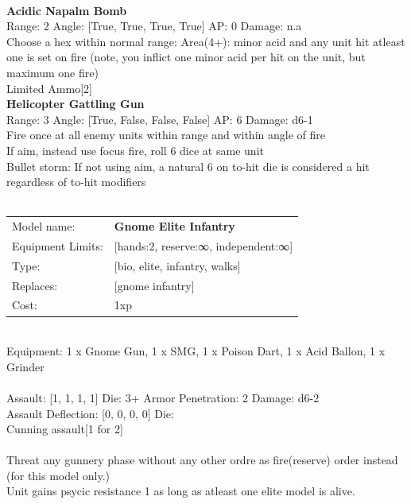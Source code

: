\ \\
{\bf Acidic Napalm Bomb } \\



Range: 2  Angle: [True, True, True, True] AP: 0 Damage: n.a \\
Choose a hex within normal range: Area(4+): minor acid and any unit hit atleast one is set on fire (note, you inflict one minor acid per hit on the unit, but maximum one fire)\\ 
Limited Ammo[2]\\ 




{\bf Helicopter Gattling Gun } \\



Range: 3  Angle: [True, False, False, False] AP: 6 Damage: d6-1 \\
Fire once at all enemy units within range and within angle of fire\\ 
If aim, instead use focus fire, roll 6 dice at same unit\\ 
Bullet storm: If not using aim, a natural 6 on to-hit die is considered a hit regardless of to-hit modifiers\\ 




 
\ \\

\noindent
\begin{tabular}{ll}
Model name: &{\bf Gnome Elite Infantry } \\
Equipment Limits: &[hands:2, reserve:∞, independent:∞] \\
Type: &[bio, elite, infantry, walks] \\
Replaces: &[gnome infantry] \\
Cost: & 1xp\\
\end{tabular}
\ \\
Equipment: 1 x Gnome Gun, 1 x SMG, 1 x Poison Dart, 1 x Acid Ballon, 1 x Grinder \\
\ \\
Assault: [1, 1, 1, 1] Die: 3+ Armor Penetration: 2 Damage: d6-2 \\
Assault Deflection: [0, 0, 0, 0] Die: \\
\indent Cunning assault[1 for 2]\\ 
 
\ \\
Threat any gunnery phase without any other ordre as fire(reserve) order instead (for this model only.)\\ 
Unit gains psycic resistance 1 as long as atleast one elite model is alive.\\ 

